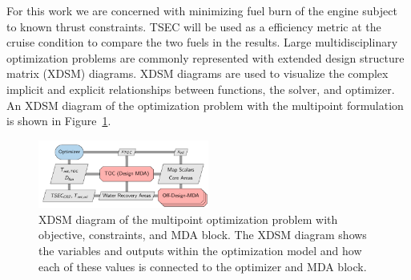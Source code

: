 \documentclass[conf]{new-aiaa}
\begin{document}
For this work we are concerned with minimizing fuel burn of the engine subject to known thrust constraints.
TSEC will be used as a efficiency metric at the cruise condition to compare the two fuels in the results.
Large multidisciplinary optimization problems are commonly represented with extended design structure matrix (XDSM) diagrams.
XDSM diagrams are used to visualize the complex implicit and explicit relationships between functions, the solver, and optimizer.
An XDSM diagram of the optimization problem with the multipoint formulation is shown in Figure~\ref{fig:N3_opt_xdsm}.

\begin{figure}[!hbt]
    \centering
    \includegraphics[width=0.5\textwidth]{N3_opt_XDSM.pdf}
    \caption{
        XDSM diagram of the multipoint optimization problem with objective, constraints, and MDA block.
        The XDSM diagram shows the variables and outputs within the optimization model and how each of these values is connected to the optimizer and MDA block.}
    \label{fig:N3_opt_xdsm}
\end{figure}

\end{document}
